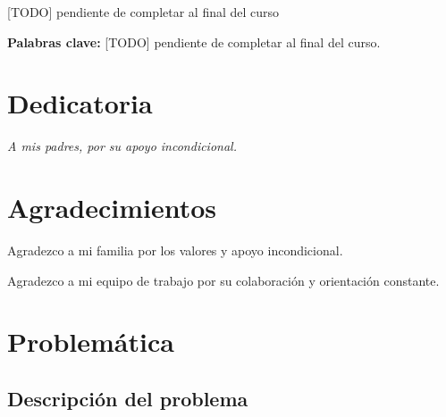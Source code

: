\documentclass[12pt,a4paper,oneside]{book}
\begin{document}
[TODO] pendiente de completar al final del curso

\textbf{Palabras clave:} [TODO] pendiente de completar al final del curso.

\chapter*{Dedicatoria}

\vspace*{5cm}
\begin{flushright}
\itshape
A mis padres, por su apoyo incondicional.\\[0.5cm]
\end{flushright}

\chapter*{Agradecimientos}

Agradezco a mi familia por los valores y apoyo incondicional.

Agradezco a mi equipo de trabajo por su colaboración y orientación constante.


\tableofcontents

\listoftables
{}

\listoffigures
{}

\mainmatter
{}

\chapter{Problemática}
\label{cap:problematica}

\section{Descripción del problema}
\label{sec:descripcion-problema}
\end{document}
